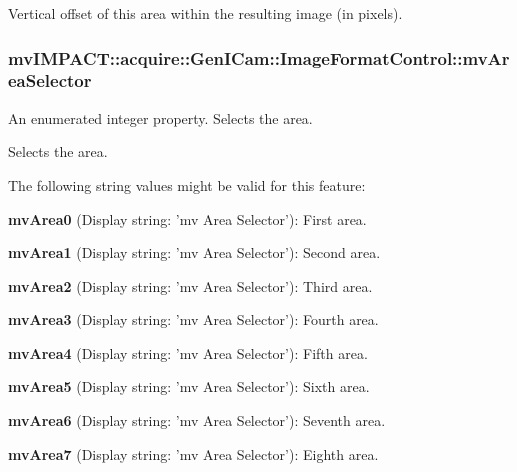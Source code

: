 Vertical offset of this area within the resulting image (in pixels). \hypertarget{classmv_i_m_p_a_c_t_1_1acquire_1_1_gen_i_cam_1_1_image_format_control_ae1672002a8299739cf2253de54bab577}{
\subsubsection[{mv\+Area\+Selector}]{ mv\+I\+M\+P\+A\+C\+T\+::acquire\+::\+Gen\+I\+Cam\+::\+Image\+Format\+Control\+::mv\+Area\+Selector}}\label{classmv_i_m_p_a_c_t_1_1acquire_1_1_gen_i_cam_1_1_image_format_control_ae1672002a8299739cf2253de54bab577}


An enumerated integer property. Selects the area. 

Selects the area.

The following string values might be valid for this feature\+:
\begin{DoxyItemize}
\item {\bfseries mv\+Area0} (Display string\+: 'mv Area Selector')\+: First area.
\item {\bfseries mv\+Area1} (Display string\+: 'mv Area Selector')\+: Second area.
\item {\bfseries mv\+Area2} (Display string\+: 'mv Area Selector')\+: Third area.
\item {\bfseries mv\+Area3} (Display string\+: 'mv Area Selector')\+: Fourth area.
\item {\bfseries mv\+Area4} (Display string\+: 'mv Area Selector')\+: Fifth area.
\item {\bfseries mv\+Area5} (Display string\+: 'mv Area Selector')\+: Sixth area.
\item {\bfseries mv\+Area6} (Display string\+: 'mv Area Selector')\+: Seventh area.
\item {\bfseries mv\+Area7} (Display string\+: 'mv Area Selector')\+: Eighth area.
\end{DoxyItemize}

